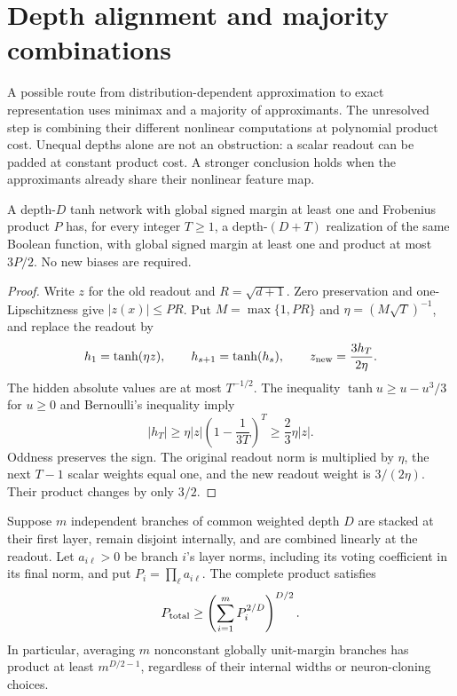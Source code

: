 \section{Depth alignment and majority combinations}
\label{sec:pf-majority-closure}

A possible route from distribution-dependent approximation to exact
representation uses minimax and a majority of approximants. The unresolved
step is combining their different nonlinear computations at polynomial
product cost. Unequal depths alone are not an obstruction: a scalar
readout can be padded at constant product cost. A stronger conclusion
holds when the approximants already share their nonlinear feature map.

\begin{lemma}
\label{lem:pf-scalar-padding}
A depth-$D$ tanh network with global signed margin at least one and
Frobenius product $P$ has, for every integer $T\ge1$, a depth-$(D+T)$
realization of the same Boolean function, with global signed margin
at least one and product at most $3P/2$. No new biases are required.
\end{lemma}

\begin{proof}
Write $z$ for the old readout and $R=\sqrt{d+1}$.
Zero preservation and one-Lipschitzness give $|z(x)|\le PR$.
Put $M=\max\{1,PR\}$ and $\eta=(M\sqrt T)^{-1}$, and replace the
readout by
\[
 h_1=\tanh(\eta z),\qquad h_{s+1}=\tanh(h_s),\qquad
 z_{\rm new}=\frac{3h_T}{2\eta}.
\]
The hidden absolute values are at most $T^{-1/2}$. The inequality
$\tanh u\ge u-u^3/3$ for $u\ge0$ and Bernoulli's inequality imply
\[
 |h_T|\ge\eta|z|\left(1-\frac1{3T}\right)^T
           \ge\frac23\eta|z|.
\]
Oddness preserves the sign. The original readout norm is multiplied
by $\eta$, the next $T-1$ scalar weights equal one, and the new
readout weight is $3/(2\eta)$. Their product changes by only $3/2$.
\end{proof}

\begin{proposition}
\label{prop:pf-parallel-holder}
Suppose $m$ independent branches of common weighted depth $D$ are
stacked at their first layer, remain disjoint internally, and are
combined linearly at the readout. Let $a_{i\ell}>0$ be branch $i$'s
layer norms, including its voting coefficient in its final norm, and
put $P_i=\prod_\ell a_{i\ell}$. The complete product satisfies
\[
 P_{\rm total}\ge
       \left(\sum_{i=1}^m P_i^{2/D}\right)^{D/2}.
\]
In particular, averaging $m$ nonconstant globally unit-margin branches
has product at least $m^{D/2-1}$, regardless of their internal widths
or neuron-cloning choices.
\end{proposition}

